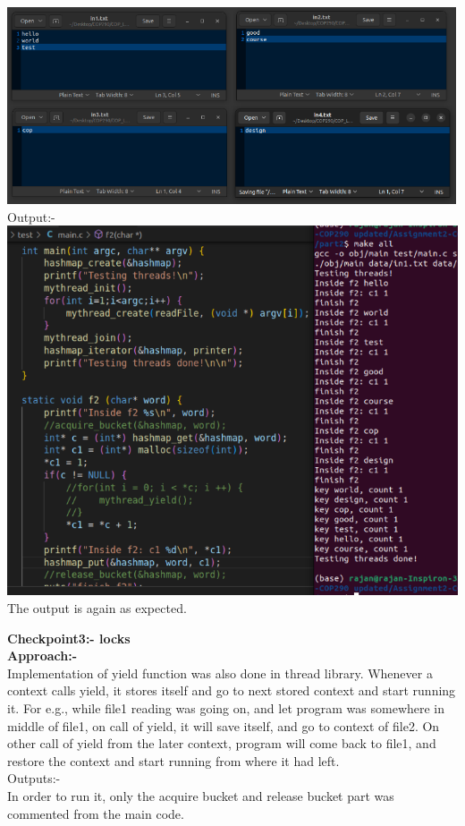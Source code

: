 \documentclass[12pt]{article}
\begin{document}
\begin{spacing}{1.2}
\includegraphics[width=16cm]{images/16.png}\\
Output:-\\
\includegraphics[width=16cm]{images/17.png}\\
The output is again as expected.\\

    \newpage

\textbf{Checkpoint3:- locks}\\

\textbf{Approach:-} \\
Implementation of yield function was also done in thread library. Whenever a context calls yield, it stores itself and go to next stored context and start running it. For e.g., while file1 reading was going on, and let program was somewhere in middle of file1, on call of yield, it will save itself, and go to context of file2. On other call of yield from the later context, program will come back to file1, and restore the context and start running from where it had left.
\\
Outputs:-\\
In order to run it, only the acquire bucket and release bucket part was commented from the main code.\\


\end{spacing}
\end{document}
